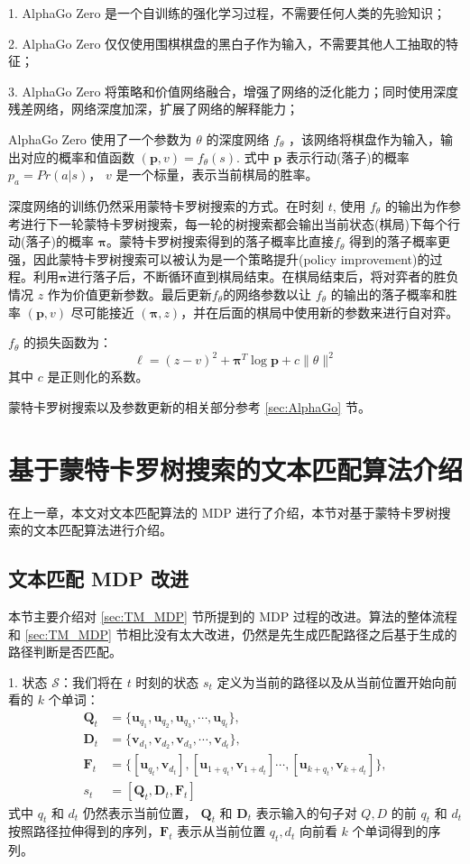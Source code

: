 1. AlphaGo Zero 是一个自训练的强化学习过程，不需要任何人类的先验知识；

2. AlphaGo Zero 仅仅使用围棋棋盘的黑白子作为输入，不需要其他人工抽取的特征；

3. AlphaGo Zero 将策略和价值网络融合，增强了网络的泛化能力；同时使用深度残差网络，网络深度加深，扩展了网络的解释能力；

AlphaGo Zero 使用了一个参数为 $\theta$ 的深度网络 $f_\theta$ ，该网络将棋盘作为输入，输出对应的概率和值函数 $(\mathbf{p}, v) = f_\theta(s)$. 式中 $\mathbf{p}$ 表示行动(落子)的概率$p_a = Pr(a|s)$， $v$ 是一个标量，表示当前棋局的胜率。

深度网络的训练仍然采用蒙特卡罗树搜索的方式。在时刻 $t$, 使用 $f_\theta$ 的输出为作参考进行下一轮蒙特卡罗树搜索，每一轮的树搜索都会输出当前状态(棋局)下每个行动(落子)的概率 $\mathbf{\pi}$。蒙特卡罗树搜索得到的落子概率比直接$f_\theta$  得到的落子概率更强，因此蒙特卡罗树搜索可以被认为是一个策略提升(policy improvement)的过程。利用$\mathbf{\pi}$进行落子后，不断循环直到棋局结束。在棋局结束后，将对弈者的胜负情况 $z$ 作为价值更新参数。最后更新$f_\theta$的网络参数以让 $f_\theta$ 的输出的落子概率和胜率 $(\mathbf{p}, v)$ 尽可能接近 $(\mathbf{\pi}, z)$，并在后面的棋局中使用新的参数来进行自对弈。

$f_\theta$ 的损失函数为：
$$
\ell = (z-v)^2 + \mathbf{\pi}^T\log \mathbf{p} + c\|\theta\|^2
$$
其中 $c$ 是正则化的系数。

蒙特卡罗树搜索以及参数更新的相关部分参考 \ref{sec:AlphaGo} 节。

\section{基于蒙特卡罗树搜索的文本匹配算法介绍}
在上一章，本文对文本匹配算法的 MDP 进行了介绍，本节对基于蒙特卡罗树搜索的文本匹配算法进行介绍。

\subsection{文本匹配 MDP 改进}
本节主要介绍对 \ref{sec:TM_MDP} 节所提到的 MDP 过程的改进。算法的整体流程和 \ref{sec:TM_MDP} 节相比没有太大改进，仍然是先生成匹配路径之后基于生成的路径判断是否匹配。

1. 状态 $\mathcal{S}$：我们将在 $t$ 时刻的状态 $s_t$ 定义为当前的路径以及从当前位置开始向前看的 $k$ 个单词：
$$
\begin{aligned}
\mathbf{Q}_t &= \{\mathbf{u}_{q_1}, \mathbf{u}_{q_2}, \mathbf{u}_{q_3}, \cdots, \mathbf{u}_{q_t}\},\\
\mathbf{D}_t &= \{\mathbf{v}_{d_1}, \mathbf{v}_{d_2}, \mathbf{v}_{d_3},\cdots, \mathbf{v}_{d_t}\},\\
\mathbf{F}_t &= \{[\mathbf{u}_{q_t}, \mathbf{v}_{d_t}], [\mathbf{u}_{1+q_t},\mathbf{v}_{1+d_t}] \cdots, [\mathbf{u}_{k+q_t}, \mathbf{v}_{k+d_t}]\},\\
s_t &= [\mathbf{Q}_t, \mathbf{D}_t, \mathbf{F}_t]
\end{aligned}
$$
式中 $q_t$ 和 $d_t$ 仍然表示当前位置， $\mathbf{Q}_t$ 和 $\mathbf{D}_t$ 表示输入的句子对 $Q, D$ 的前 $q_t$ 和 $d_t$ 按照路径拉伸得到的序列，$\mathbf{F}_t$ 表示从当前位置 $q_t, d_t$ 向前看 $k$ 个单词得到的序列。

